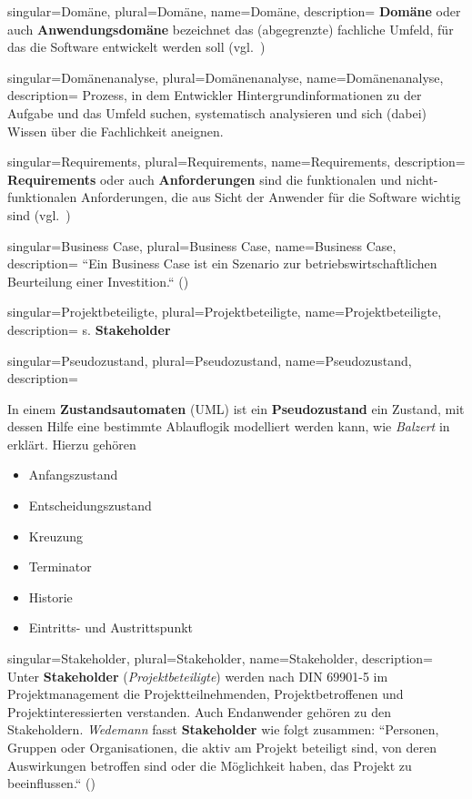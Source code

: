 {
singular={Domäne},
plural={Domäne},
name={Domäne},
description={
\textbf{Domäne} oder auch \textbf{Anwendungsdomäne} bezeichnet das (abgegrenzte) fachliche Umfeld, für das die Software entwickelt werden soll (vgl.~\cite[41]{Wed09})
}
}

{
singular={Domänenanalyse},
plural={Domänenanalyse},
name={Domänenanalyse},
description={
Prozess, in dem Entwickler Hintergrundinformationen zu der Aufgabe und das Umfeld suchen, systematisch analysieren und sich (dabei) Wissen über die Fachlichkeit aneignen.
}
}


{
singular={Requirements},
plural={Requirements},
name={Requirements},
description={
\textbf{Requirements} oder auch \textbf{Anforderungen} sind die funktionalen und nicht-funktionalen Anforderungen, die aus Sicht der Anwender für die Software wichtig sind  (vgl.~\cite[41]{Wed09})
}
}

{
singular={Business Case},
plural={Business Case},
name={Business Case},
description={
``Ein Business Case ist ein Szenario zur betriebswirtschaftlichen Beurteilung einer Investition.`` (\cite[11]{Brug09})
}
}

{
singular={Projektbeteiligte},
plural={Projektbeteiligte},
name={Projektbeteiligte},
description={
s. \textbf{Stakeholder}
}
}

{
singular={Pseudozustand},
plural={Pseudozustand},
name={Pseudozustand},
description={
In einem \textbf{Zustandsautomaten} (UML) ist ein \textbf{Pseudozustand} ein Zustand, mit dessen Hilfe eine bestimmte Ablauflogik modelliert werden kann, wie \textit{Balzert} in \cite[542]{Bal05} erklärt. Hierzu gehören
\begin{itemize}
\item Anfangszustand
\item Entscheidungszustand
\item Kreuzung
\item Terminator
\item Historie
\item Eintritts- und Austrittspunkt
\end{itemize}
}
}




{
singular={Stakeholder},
plural={Stakeholder},
name={Stakeholder},
description={
Unter \textbf{Stakeholder} (\textit{Projektbeteiligte}) werden nach DIN 69901-5 im Projektmanagement die Projektteilnehmenden,
Projektbetroffenen und Projektinteressierten verstanden.
Auch Endanwender gehören zu den Stakeholdern.
\textit{Wedemann} fasst \textbf{Stakeholder} wie folgt zusammen: ``Personen, Gruppen oder Organisationen, die aktiv am Projekt beteiligt sind, von deren Auswirkungen betroffen sind oder die Möglichkeit haben, das Projekt zu beeinflussen.`` (\cite[49]{Wed09})\\
}
}


